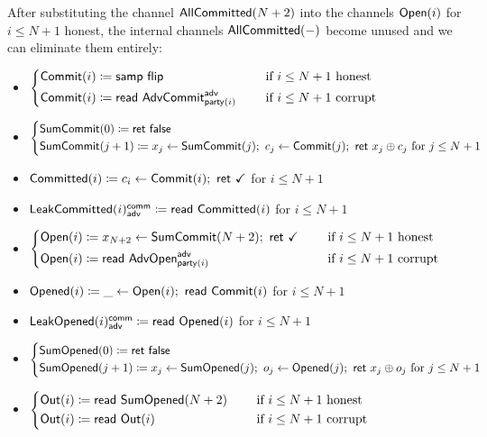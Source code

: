 \noindent After substituting the channel $\mathsf{AllCommitted}(N+2)$ into the channels $\mathsf{Open}(i)$ for $i \leq N+1$ honest, the internal channels $\mathsf{AllCommitted}(-)$ become unused and we can eliminate them entirely:

\begin{itemize}
\item {\color{blue} $\begin{cases*} \Commit(i) \coloneqq \samp{\flip} & \hspace{10pt} \text{if $i \leq N+1$ honest} \\ \Commit(i) \coloneqq \read{\AdvCommit^\adv_{\party(i)}} & \hspace{10pt} \text{if $i \leq N+1$ corrupt} \end{cases*}$}
\item {\color{blue} $\begin{cases*} \SumCommit(0) \coloneqq \ret{\false} \\ \SumCommit(j+1) \coloneqq x_j \leftarrow \SumCommit(j); \ c_j \leftarrow \Commit(j); \ \ret{x_j \oplus c_j} \text{ for $j \leq N+1$} \end{cases*}$}
\item {\color{magenta} $\mathsf{Committed}(i) \coloneqq c_i \leftarrow \mathsf{Commit}(i); \ \mathsf{ret} \ \checkmark$ for $i \leq N+1$}
\item {\color{magenta} $\mathsf{LeakCommitted}(i)^{\mathsf{comm}}_{\mathsf{adv}} \coloneqq \mathsf{read} \ \mathsf{Committed}(i)$ for $i \leq N+1$}
\item {\color{teal} $\begin{cases*} \Open(i) \coloneqq x_{N+2} \leftarrow \SumCommit(N+2); \ \ret{\checkmark} & \hspace{10pt} \text{if $i \leq N+1$ honest} \\ \Open(i) \coloneqq \read{\AdvOpen^\adv_{\party(i)}} & \hspace{10pt} \text{if $i \leq N+1$ corrupt} \end{cases*}$}
\item {\color{red} $\mathsf{Opened}(i) \coloneqq \_ \leftarrow \mathsf{Open}(i); \ \mathsf{read} \ \mathsf{Commit}(i)$ for $i \leq N+1$}
\item {\color{red} $\mathsf{LeakOpened}(i)^{\mathsf{comm}}_{\mathsf{adv}} \coloneqq \mathsf{read} \ \mathsf{Opened}(i)$ for $i \leq N+1$}
\item {\color{red} $\begin{cases*} \SumOpened(0) \coloneqq \ret{\false} \\ \SumOpened(j+1) \coloneqq x_j \leftarrow \SumOpened(j); \ o_j \leftarrow \Opened(j); \ \ret{x_j \oplus o_j} \text{ for $j \leq N+1$} \end{cases*}$}
\item $\begin{cases*} \Out(i) \coloneqq \read{\SumOpened(N+2)} & \hspace{10pt} \text{if $i \leq N+1$ honest} \\ \Out(i) \coloneqq \read{\Out(i)} & \hspace{10pt} \text{if $i \leq N+1$ corrupt} \end{cases*}$
\end{itemize}


